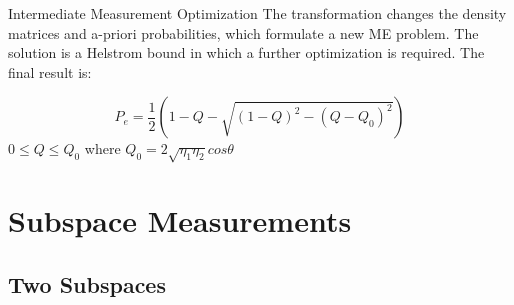 \documentclass{beamer}
\begin{document}
\begin{frame}{Intermediate Measurement Optimization}
The transformation changes the density matrices and a-priori probabilities, which formulate a new ME problem.  The solution is a Helstrom bound in which a further optimization is required.  The final result is:

\[ P_e = \frac{1}{2} (1 - Q -\sqrt{(1-Q)^2 - (Q-Q_0)^2})\]
\[\]
$0\leq Q \leq Q_0$  where $ Q_0 = 2 \sqrt{\eta_1\eta_2} cos \theta$
\end{frame}

\section{Subspace Measurements}

\subsection{Two Subspaces}
\end{document}
